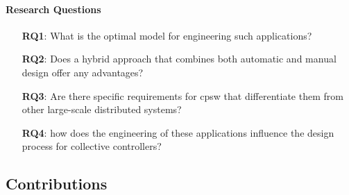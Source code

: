 \begin{refsection}
\paragraph*{Research Questions}
\begin{itemize}
    \item[\textbf{RQ1}:] What is the optimal model for engineering such applications?
    \item[\textbf{RQ2}:] Does a hybrid approach that combines both automatic and manual design offer any advantages? 
    \item[\textbf{RQ3}:] Are there specific requirements for \ac{cpsw} that differentiate them from other large-scale distributed systems?
    \item[\textbf{RQ4}:] how does the engineering of these applications influence the design process for collective controllers?
\end{itemize}

\subsection*{Contributions}


\end{refsection}
